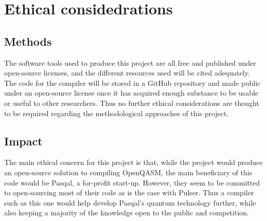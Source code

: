 \section{Ethical considedrations}
\subsection{Methods}
\label{sec:Methodethics}
The software tools used to produce this project are all free and published under open-source licenses, and the different resources used will be cited adequately.
The code for the compiler will be stored in a GitHub repository and made public under an open-source license once it has acquired enough substance to be usable 
or useful to other researchers. Thus no further ethical considerations are thought to be required regarding the methodological approaches of this project.

\subsection{Impact}
\label{sec:Impactethics}
The main ethical concern for this project is that, while the project would produce an open-source solution to compiling OpenQASM, the main beneficiary of this code would
be Pasqal, a for-profit start-up. However, they seem to be committed to open-sourcing most of their code as is the case with Pulser. Thus a compiler such as this one would
help develop Pasqal's quantum technology further, while also keeping a majority of the knowledge open to the public and competition.